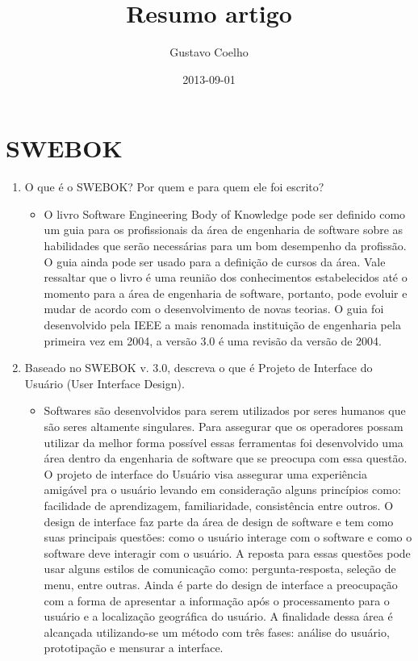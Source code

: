 \documentclass{article}
\title{Resumo artigo}
\date{2013-09-01}
\author{Gustavo Coelho}
\begin{document}

\tableofcontents{}

\newpage
\section{SWEBOK}

\begin{enumerate}
\item O que é o SWEBOK? Por quem e para quem ele foi escrito?  
	\begin{itemize}
	\item[] O livro Software Engineering Body of Knowledge pode ser definido como um guia para os profissionais da área de engenharia de software sobre as habilidades que serão necessárias para um bom desempenho da profissão. 
 O guia ainda pode ser usado para a definição de cursos da área. Vale ressaltar que o livro é uma reunião dos conhecimentos estabelecidos até o momento para a área de engenharia de software, portanto, pode evoluir e mudar de acordo com o desenvolvimento de novas teorias. O guia foi desenvolvido pela IEEE a mais renomada instituição de engenharia pela primeira vez em 2004, a versão 3.0 é uma revisão da versão de 2004.  
	\end{itemize}
\item Baseado   no   SWEBOK   v.   3.0,   descreva   o   que   é   Projeto   de   Interface   do   Usuário   (User  
Interface Design). 
	\begin{itemize}
	\item[] Softwares são desenvolvidos para serem utilizados por seres humanos que são seres altamente singulares.
 Para assegurar que os operadores possam utilizar da melhor forma possível essas ferramentas foi desenvolvido 
uma área dentro da engenharia de software que se preocupa com essa questão. 
O projeto de interface do Usuário visa assegurar uma experiência amigável pra 
o usuário levando em consideração alguns princípios como: facilidade de aprendizagem, familiaridade, consistência entre outros.
O design de interface faz parte da área de design de software e tem como  suas principais questões: como o usuário
interage com o software e como o software deve interagir com o usuário. A reposta para essas questões pode usar alguns estilos de comunicação como: pergunta-resposta, seleção de menu, entre outras. Ainda é parte do design de interface
a preocupação com a forma de apresentar a informação após o processamento para o usuário e a localização geográfica do usuário. 
A finalidade dessa área é alcançada utilizando-se
um método com três fases: análise do usuário, prototipação e mensurar a interface. 

\end{itemize}
\end{enumerate}
\end{document}

